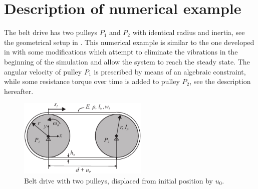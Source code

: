\section{Description of numerical example}
The belt drive has two pulleys $P_1$ and $P_2$ with identical radius and inertia, see the geometrical setup in . 
This numerical example is similar to the one developed in \cite{Pechstein2013} with some modifications which attempt to eliminate the vibrations in the beginning of the simulation and allow the system to reach the steady state. The angular velocity of pulley $P_1$ is prescribed by means of an algebraic constraint, while some resistance torque over time is added to pulley $P_2$, see the description hereafter.
\begin{figure}[tbph]
    \centering
    \includegraphics[width=0.55\textwidth]{figures/ESR8_beltPechstein.pdf}
    \caption{Belt drive with two pulleys, displaced from initial position by $u_0$.}
    \label{fig:ESR8_BeltDrive}
\end{figure}
